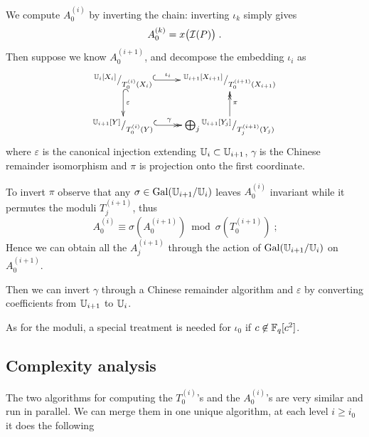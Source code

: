 We compute $A_0^{(i)}$ by inverting the chain: inverting $\iota_k$
simply gives
\begin{equation}
  \label{eq:A_0^k}
  A_0^{(k)} = x\bigl(\mathcal{I}(P)\bigr)
  \;\text{.}
\end{equation}
Then suppose we know $A_0^{(i+1)}$, and decompose the embedding
$\iota_i$ as
\begin{equation}
  \xymatrix{
    ^{\U_i[X_i]}/_{T_0^{(i)}(X_i)} \ar@{^{(}->}[r]^-{\iota_i} \ar@{^{(}->}[d]^{\varepsilon} &
    ^{\U_{i+1}[X_{i+1}]}/_{T_0^{(i+1)}(X_{i+1})} \\
    ^{\U_{i+1}[Y]}/_{T_0^{(i)}(Y)} \ar@{^{(}->>}[r]^-{\gamma} &
    \bigoplus_j {}^{\U_{i+1}[Y_{j}]}/_{T_j^{(i+1)}(Y_{j})} \ar@{->>}[u]_{\pi}
  }
\end{equation}
where $\varepsilon$ is the canonical injection extending
$\mathbb{U}_i\subset\mathbb{U}_{i+1}$, $\gamma$ is the Chinese remainder isomorphism
and $\pi$ is projection onto the first coordinate.

To invert $\pi$ observe that any $\sigma\in\operatorname{Gal}(\mathbb{U}_{i+1}/\mathbb{U}_i)$ leaves
$A_0^{(i)}$ invariant while it permutes the moduli $T_j^{(i+1)}$, thus
\begin{equation}
  A_0^{(i)} \equiv \sigma\left(A_0^{(i+1)}\right)
  \bmod \sigma\left(T_0^{(i+1)}\right)
  \;\text{;}
\end{equation}
Hence we can obtain all the $A_j^{(i+1)}$ through the action of
$\operatorname{Gal}(\mathbb{U}_{i+1}/\mathbb{U}_i)$ on $A_0^{(i+1)}$.

Then we can invert $\gamma$ through a Chinese remainder algorithm
\cite[$\S$10.3]{vzGG} and $\varepsilon$ by converting coefficients from
$\mathbb{U}_{i+1}$ to $\mathbb{U}_i$.

As for the moduli, a special treatment is needed for $\iota_0$ if
$c\not\in\mathbb{F}_q[c^2]$.


\subsection{Complexity analysis}
\label{sec:C2-AS-FI:complexity}

The two algorithms for computing the $T_{0}^{(i)}$'s and the
$A_{0}^{(i)}$'s are very similar and run in parallel. We can merge
them in one unique algorithm, at each level $i\ge i_0$ it does the
following

